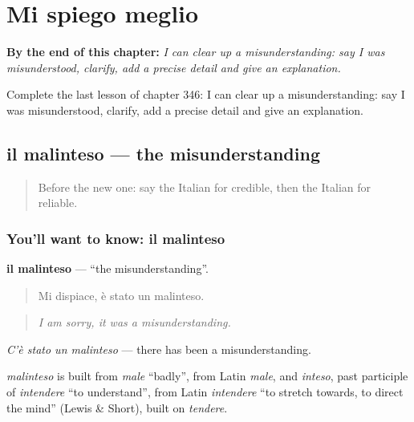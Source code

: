 
\chapter{Mi spiego meglio}
\label{ch:it-mi-spiego-meglio}

\begin{chapteropening}
\textbf{By the end of this chapter:} \emph{I can clear up a misunderstanding: say I was misunderstood, clarify, add a precise detail and give an explanation.}

Complete the last lesson of chapter 346: I can clear up a misunderstanding: say I was misunderstood, clarify, add a precise detail and give an explanation.
\end{chapteropening}

\section[il malinteso]{il malinteso — the misunderstanding}

\label{lesson:IT-C346-malinteso}



\begin{quote}
Before the new one: say the Italian for credible, then the Italian for reliable.
\end{quote}

\subsection*{You'll want to know: il malinteso}
\textbf{il malinteso} — \textquotedblleft{}the misunderstanding\textquotedblright{}.

\begin{quote}
Mi dispiace, è stato un malinteso.
\end{quote}

\begin{quote}
\emph{I am sorry, it was a misunderstanding.}
\end{quote}

\emph{C'è stato un malinteso} — there has been a misunderstanding.

\begin{cousinweb}
\emph{malinteso} is built from \emph{male} \textquotedblleft{}badly\textquotedblright{}, from Latin \emph{male}, and \emph{inteso}, past participle of \emph{intendere} \textquotedblleft{}to understand\textquotedblright{}, from Latin \emph{intendere} \textquotedblleft{}to stretch towards, to direct the mind\textquotedblright{} (Lewis \& Short), built on \emph{tendere}.
\end{cousinweb}

